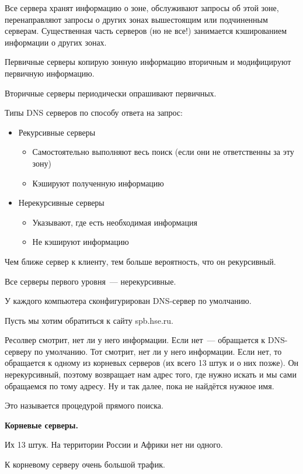 Все сервера хранят информацию о зоне, обслуживают запросы об этой зоне, перенаправляют запросы о других зонах вышестоящим или подчиненным серверам. Существенная часть серверов (но не все!) занимается кэшированием информации о других зонах.

Первичные серверы копирую зонную информацию вторичным и модифицируют первичную информацию.

Вторичные серверы периодически опрашивают первичных.

Типы DNS серверов по способу ответа на запрос:
\begin{itemize}
    \item Рекурсивные серверы
    \begin{itemize}
        \item Самостоятельно выполняют весь поиск (если они не ответственны за эту зону)
        \item Кэшируют полученную информацию
    \end{itemize}
    \item Нерекурсивные серверы
    \begin{itemize}
        \item Указывают, где есть необходимая информация
        \item Не кэшируют информацию
    \end{itemize}
\end{itemize}

Чем ближе сервер к клиенту, тем больше вероятность, что он рекурсивный.

Все серверы первого уровня~--- нерекурсивные.

У каждого компьютера сконфигурирован DNS-сервер по умолчанию.

Пусть мы хотим обратиться к сайту spb.hse.ru.

Ресолвер смотрит, нет ли у него информации. Если нет~--- обращается к DNS-серверу по умолчанию. Тот смотрит, нет ли у него информации. Если нет, то обращается к одному из корневых серверов (их всего 13 штук и о них позже). Он нерекурсивный, поэтому возвращает нам адрес того, где нужно искать и мы сами обращаемся по тому адресу. Ну и так далее, пока не найдётся нужное имя.

Это называется процедурой прямого поиска.

{\bf Корневые серверы.}

Их 13 штук. На территории России и Африки нет ни одного.

К корневому серверу очень большой трафик.

